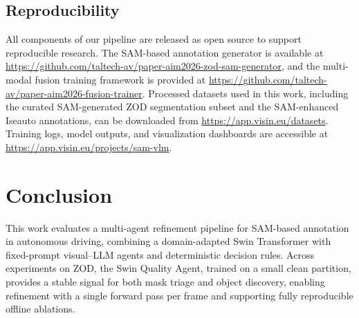 \documentclass[conference]{IEEEtran}
\begin{document}
\subsection{Reproducibility}

All components of our pipeline are released as open source to support reproducible research. The SAM-based annotation generator is available at
\url{https://github.com/taltech-av/paper-aim2026-zod-sam-generator},
and the multi-modal fusion training framework is provided at
\url{https://github.com/taltech-av/paper-aim2026-fusion-trainer}.
Processed datasets used in this work, including the curated SAM-generated ZOD segmentation subset and the SAM-enhanced Iseauto annotations, can be downloaded from
\url{https://app.visin.eu/datasets}.
Training logs, model outputs, and visualization dashboards are accessible at
\url{https://app.visin.eu/projects/sam-vlm}.

\section{Conclusion}
\label{sec:conclusion}

This work evaluates a multi-agent refinement pipeline for SAM-based annotation in autonomous driving, combining a domain-adapted Swin Transformer with fixed-prompt visual--LLM agents and deterministic decision rules. Across experiments on ZOD, the Swin Quality Agent, trained on a small clean partition, provides a stable signal for both mask triage and object discovery, enabling refinement with a single forward pass per frame and supporting fully reproducible offline ablations.
\end{document}
